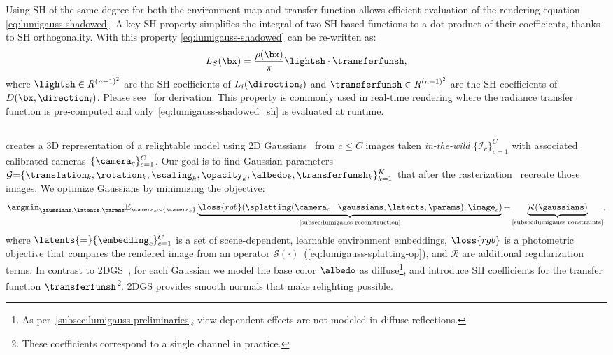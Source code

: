      Using SH of the same degree for both the environment map and transfer function
      allows efficient evaluation of the rendering equation
      \cref{eq:lumigauss-shadowed}.
      A key SH property simplifies the integral of two SH-based functions to a dot
      product of their coefficients, thanks to SH orthogonality.
      With this property \cref{eq:lumigauss-shadowed} can be re-written as:
      \begin{equation}
        \label{eq:lumigauss-shadowed_sh}
        L_{S}(\bx) = \frac{\rho(\bx)}{\pi} \lightsh \cdot \transferfunsh,
      \end{equation} where $\lightsh \in R^{(n+1)^2}$ are the SH coefficients of
      $L_i(\direction_i)$ and $\transferfunsh \in R^{(n+1)^2}$ are the SH
      coefficients of $D(\bx, \direction_i)$.
      Please see~\cite{slomp2006gentle, green2003grittydetail} for derivation.
      This property is commonly used in real-time rendering where the radiance
      transfer function is pre-computed and only~\cref{eq:lumigauss-shadowed_sh} is
      evaluated at runtime.

  \subsection{\lumigauss}
    \lumigauss creates a 3D representation of a relightable model using 2D Gaussians~\cite{huang20242d} from $c\leq C$ images taken \textit{in-the-wild}  $\{\mathcal{I}_c\}_{c=1}^C$ with associated calibrated cameras~$\{\camera_c\}_{c=1}^C$.
    Our goal is to find Gaussian parameters
    $\mathcal{G}{=}\{\translation_k,\rotation_k,\scaling_k,\opacity_k,
      \albedo_k,\transferfunsh_k\}^K_{k=1}$ that after the
    rasterization~\cite{kerbl20233d} recreate those images.
    We optimize Gaussians by minimizing the objective:
    \begin{equation}
      \argmin_{\gaussians, \latents,\params} \mathbb{E}_{\camera_c\sim \{\camera_c\}} \underbrace{\loss{rgb}\!\left(\splatting(\camera_c\;|\;\gaussians, \latents, \params), \image_c\right)}_{\text{\cref{subsec:lumigauss-reconstruction}}}  + \underbrace{\mathcal{R}(\gaussians)}_{\text{\cref{subsec:lumigauss-constraints}}},
    \end{equation}
    where $\latents{=}\{\embedding_c\}_{c=1}^C$ is a set of scene-dependent, learnable environment embeddings, $\loss{rgb}$ is a photometric objective that compares the rendered image from an operator $\mathcal{S}(\cdot)$~(\cref{eq:lumigauss-splatting-op}), and $\mathcal{R}$ are additional regularization terms.
    In contrast to 2DGS~\cite{huang20242d}, for each Gaussian we model the base
    color $\albedo$ as diffuse\footnote{As
      per~\cref{subsec:lumigauss-preliminaries}, view-dependent effects are not
      modeled in diffuse reflections.
    }, and introduce SH coefficients for the transfer function $\transferfunsh$\footnote{These coefficients correspond to a single channel in practice.}. 2DGS provides smooth normals that make relighting possible.

